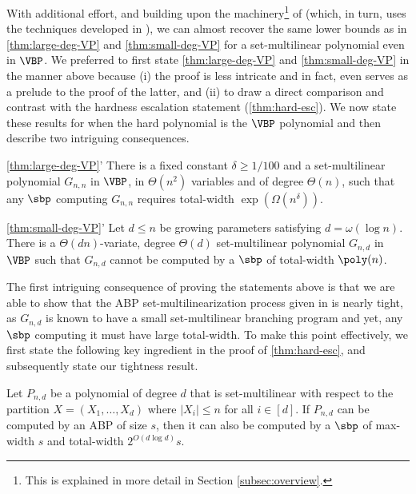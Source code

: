 \documentclass{article}
\begin{document}
With additional effort, and building upon the machinery\footnote{This is explained in more detail in Section \ref{subsec:overview}.} of \cite{KushS23} (which, in turn, uses the techniques developed in \cite{DvirMPY12}), we can almost recover the same lower bounds as in \autoref{thm:large-deg-VP} and \autoref{thm:small-deg-VP} for a set-multilinear polynomial even in $\VBP$. We preferred to first state \autoref{thm:large-deg-VP} and \autoref{thm:small-deg-VP} in the manner above because (i) the proof is  less intricate and in fact, even serves as a prelude to the proof of the latter, and (ii) to draw a direct comparison and contrast with the hardness escalation statement (\autoref{thm:hard-esc}). We now state these results for when the hard polynomial is the $\VBP$ polynomial and then describe two intriguing consequences.

\begin{manualtheorem}{\ref{thm:large-deg-VP}'}\label{thm:large-deg-VBP}
    There is a fixed constant $\delta \geq 1/100$ and a set-multilinear polynomial $G_{n,n}$ in $\VBP$, in  $\Theta(n^2)$ variables and of degree $\Theta(n)$,  such that any $\sbp$ computing $G_{n,n}$ requires total-width ${\exp(\Omega(n^{\delta}))}$.
\end{manualtheorem}

\begin{manualtheorem}{\ref{thm:small-deg-VP}'}\label{thm:small-deg-VBP}
Let $d\leq n$ be growing parameters satisfying $d = \omega(\log n)$. There is a  $\Theta(dn)$-variate, degree $\Theta(d)$ set-multilinear polynomial $G_{n,d}$ in $\VBP$ such that $G_{n,d}$  cannot be computed by a $\sbp$ of total-width $\poly(n)$.
\end{manualtheorem}

The first intriguing consequence of proving the statements above is that we are able to show that the ABP set-multilinearization process given in \cite{BDS23} is nearly tight, as $G_{n,d}$ is known to have a small set-multilinear branching program and yet, any $\sbp$ computing it must have large total-width. To make this point effectively, we first state the following key ingredient in the proof of \autoref{thm:hard-esc}, and subsequently state our tightness result.

\begin{lem}\label{lem:ABP-sml}
Let $P_{n,d}$ be a polynomial of degree
$d$ that is set-multilinear with respect to the partition $X = (X_1,\ldots,X_d)$ where $|X_i| \leq n$ for all $i \in [d]$. If $P_{n,d}$ can be computed by an ABP of size $s$, then it can also be computed by a $\sbp$ of max-width $s$ and total-width $2^{O(d\log d)} s$.   
\end{lem}
\end{document}

